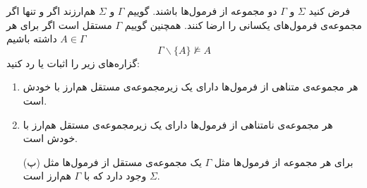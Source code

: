 فرض کنید $\Sigma$ و $\Gamma$ دو مجموعه از فرمول‌ها باشند. گوییم $\Gamma$ و $\Sigma$ هم‌ارزند اگر و تنها اگر مجموعه‌ی فرمول‌های یکسانی را ارضا کنند. همچنین گوییم $\Gamma$ مستقل است اگر برای هر $A\in\Gamma$ داشته باشیم
$$
\Gamma\backslash\{A\}\not\models A
$$
گزاره‌های زیر را اثبات یا رد کنید:
\begin{enumerate}
\item
هر مجموعه‌ی متناهی از فرمول‌ها دارای یک زیرمجموعه‌ی مستقل هم‌ارز با خودش است.
\item
هر مجموعه‌ی نامتناهی از فرمول‌ها دارای یک زیرمجموعه‌ی مستقل هم‌ارز با خودش است.
\item[(پ)]
برای هر مجموعه از فرمول‌ها مثل $\Gamma$ یک مجموعه‌ی مستقل از فرمول‌ها مثل $\Sigma$ وجود دارد که با $\Gamma$ هم‌ارز است.
\end{enumerate}\quad\vspace{-9mm}
